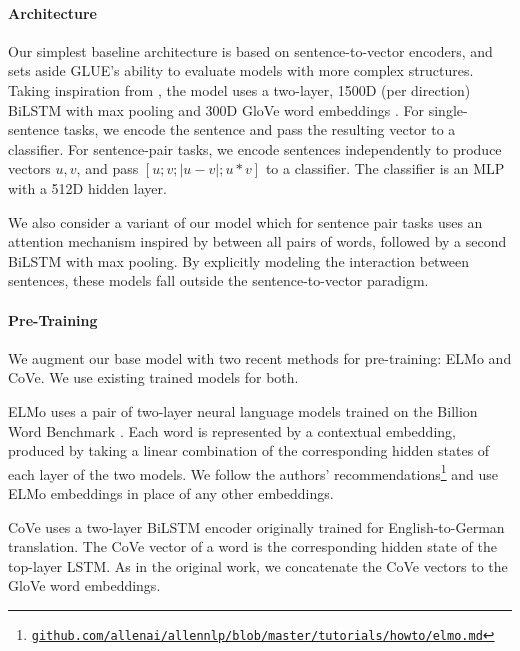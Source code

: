 \documentclass{article} \usepackage{iclr2019_conference,times}
\begin{document}
\paragraph{Architecture}

Our simplest baseline architecture is based on sentence-to-vector encoders, and sets aside GLUE's ability to evaluate models with more complex structures.
Taking inspiration from \citet{DBLP:conf/emnlp/ConneauKSBB17}, the model uses a two-layer, 1500D (per direction) BiLSTM with max pooling and 300D GloVe word embeddings \citep[840B Common Crawl version;][]{pennington2014glove}.
For single-sentence tasks, we encode the sentence and pass the resulting vector to a classifier.
For sentence-pair tasks, we encode sentences independently to produce vectors $u, v$, and pass $[u; v; |u - v|; u * v]$ to a classifier.
The classifier is an MLP with a 512D hidden layer.

We also consider a variant of our model which for sentence pair tasks uses an attention mechanism inspired by \citet{seo2016bidirectional} between all pairs of words, followed by a second BiLSTM with max pooling.
By explicitly modeling the interaction between sentences, these models fall outside the sentence-to-vector paradigm.

\paragraph{Pre-Training} We augment our base model with two recent methods for pre-training: ELMo and CoVe. 
We use existing trained models for both.

ELMo uses a pair of two-layer neural language models trained on the Billion Word Benchmark \citep{chelba2013one}. 
Each word is represented by a contextual embedding, produced by taking a linear combination of the corresponding hidden states of each layer of the two models. 
We follow the authors' recommendations\footnote{\href{https://github.com/allenai/allennlp/blob/master/tutorials/how_to/elmo.md}{\tt github.com/\allowbreak allenai/\allowbreak allennlp/\allowbreak blob/\allowbreak master/\allowbreak tutorials/\allowbreak how\textunderscore to/\allowbreak elmo.md}} and use ELMo embeddings in place of any other embeddings.

CoVe \citep{mccann2017learned} uses a two-layer BiLSTM encoder originally trained for English-to-German translation. 
The CoVe vector of a word is the corresponding hidden state of the top-layer LSTM. 
As in the original work, we concatenate the CoVe vectors to the GloVe word embeddings. 
\end{document}
